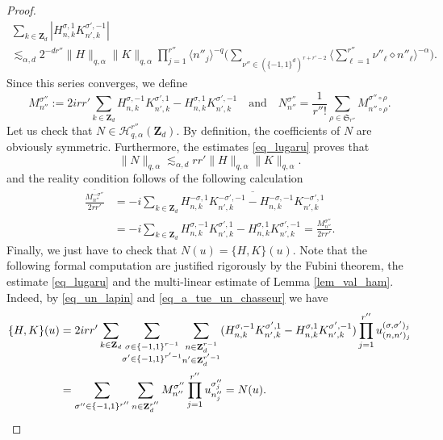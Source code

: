 \begin{proof}
\begin{multline}
\sum_{k\in \mathbf{Z}_d}|H_{n,k}^{\sigma,1} K_{n',k}^{\sigma',-1}|\\[-15pt] \lesssim_{\alpha,d} 2^{-dr''}\| H \|_{q,\alpha} \|K \|_{q,\alpha}\prod_{j=1}^{r''} \langle n''_j \rangle^{-q}
\Big(\! \! \! \! \! \! \! \! \! \! \! \! \! \sum_{\nu'' \in (\{-1,1\}^d)^{r+r'-2} } \! \! \big\langle \sum_{\ell =1}^{r''} \nu''_{\ell} \diamond n''_{\ell} \big\rangle^{-\alpha} \Big).
\end{multline}
Since this series converges, we define
\[
M_{n''}^{\sigma''}:= 2 i r r' \sum_{k\in \mathbf{Z}_d} H_{n,k}^{\sigma,-1} K_{n',k}^{\sigma',1} - H_{n,k}^{\sigma,1} K_{n',k}^{\sigma',-1} \quad \text{and} \quad N_{n''}^{\sigma''} = \frac1{r'' !} \sum_{\rho \in \mathfrak{S}_{r''}} M_{n''\circ \rho}^{\sigma''\circ \rho}.
\]
Let us check that $N\in \mathscr{H}_{q,\alpha}^{r''}(\mathbf{Z}_d)$. By definition, the coefficients of $N$ are obviously symmetric. Furthermore, the estimates \eqref{eq_lugaru} proves that
\[
\| N\|_{q,\alpha} \lesssim_{\alpha,d} r r' \| H \|_{q,\alpha} \|K \|_{q,\alpha}.
\]
and the reality condition follows of the following calculation
\begin{equation*}
\begin{split}
\frac{\overline{M_{n''}^{-\sigma''} }}{2rr'} &= -i \sum_{k\in \mathbf{Z}_d} \overline{H_{n,k}^{-\sigma,1} K_{n',k}^{-\sigma',-1} - H_{n,k}^{-\sigma,-1} K_{n',k}^{-\sigma',1}}
\\ &= -i \sum_{k\in \mathbf{Z}_d} H_{n,k}^{\sigma,-1} K_{n',k}^{\sigma',1} - H_{n,k}^{\sigma,1} K_{n',k}^{\sigma',-1} = \frac{M_{n''}^{\sigma''}}{2rr'}.
\end{split}
\end{equation*}
Finally, we just have to check that $N(u) = \{ H,K\}(u) $. Note that the following formal computation are justified rigorously by the Fubini theorem, the estimate \eqref{eq_lugaru} and the multi-linear estimate of Lemma \ref{lem_val_ham}. Indeed, by \eqref{eq_un_lapin} and \eqref{eq_a_tue_un_chasseur} we have
\begin{align*}
\{ H,K\}(u) &= 2irr' \sum_{k\in \mathbf{Z}_d} \! \sum_{\substack{\sigma \in \{-1,1\}^{r-1}\\ \sigma' \in \{-1,1\}^{r'-1} }} \! \sum_{\substack{n\in \mathbf{Z}_d^{r-1} \\ n'\in \mathbf{Z}_d^{r'-1} }} (H_{n,k}^{\sigma,-1} K_{n',k}^{\sigma',1} -H_{n,k}^{\sigma,1} K_{n',k}^{\sigma',-1}) \prod_{j=1}^{r''} u_{(n,n')_j}^{(\sigma,\sigma')_j} \\
&= \sum_{\sigma'' \in \{-1,1\}^{r''}} \sum_{n\in \mathbf{Z}_d^{r''} } M_{n''}^{\sigma''}\prod_{j=1}^{r''} u_{n''_j}^{\sigma''_j} = N(u).\qedhere
\end{align*}
\end{proof}

